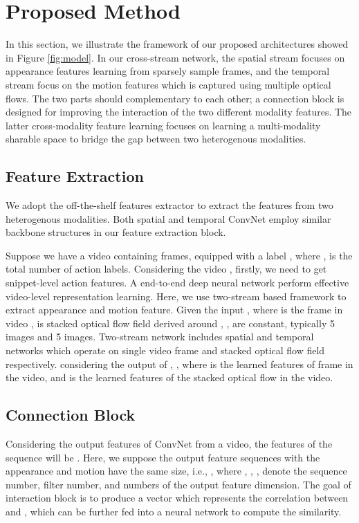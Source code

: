 \documentclass[conference,compsoc]{IEEEtran}
\begin{document}
\section{Proposed Method}
\label{S:3}


In this section, we illustrate the framework of our proposed architectures showed in Figure \ref{fig:model}. In our cross-stream network, the spatial stream focuses on appearance features learning from sparsely sample frames, and the temporal stream focus on the motion features which is captured using multiple optical flows. The two parts should complementary to each other; a connection block is designed for improving the interaction of the two different modality features. The latter cross-modality feature learning focuses on learning a multi-modality sharable space to bridge the gap between two heterogenous modalities.

\subsection{Feature Extraction}

We adopt the off-the-shelf features extractor to extract the features from two heterogenous modalities. Both spatial and temporal ConvNet employ similar backbone structures in our feature extraction block.


Suppose we have a video  containing  frames,  equipped with a label , where ,   is the total number of action labels. Considering the video , firstly, we need to get snippet-level action features. A end-to-end deep neural network perform effective video-level representation learning. Here, we use two-stream based framework \cite{simonyan2014two} to extract appearance and motion feature. Given the input , where  is the  frame in video ,  is stacked optical flow field derived around ,  ,  are constant, typically 5  images and 5  images. Two-stream network includes spatial and temporal networks which operate on single video frame  and stacked optical flow field  respectively. considering the output of , , where  is the learned features of  frame in the  video, and  is the learned features of the stacked optical flow  in the  video.

\subsection{Connection Block}

Considering the output features of ConvNet from a video, the features of the sequence  will be . Here, we suppose the output feature sequences with the appearance and motion have the same size, i.e., , where , , , denote the sequence number, filter number, and numbers of the output feature dimension. The goal of interaction block is to produce a vector which represents the correlation between  and , which can be further fed into a neural network to compute the similarity.
\end{document}

